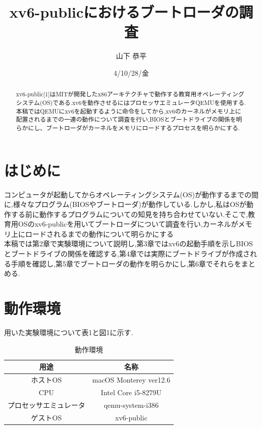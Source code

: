 \documentclass[submit,techreq,noauthor]{eco}	%
\begin{document}
\date   {4/10/28/金}				%
\title  {xv6-publicにおけるブートローダの調査}	%
\author {山下 恭平}				%


\begin{abstract}
xv6-public[1]はMITが開発したx86アーキテクチャで動作する教育用オペレーティングシステム(OS)である.xv6を動作させるにはプロセッサエミュレータQEMUを使用する.本稿ではQEMUにxv6を起動するように命令をしてから,xv6のカーネルがメモリ上に配置されるまでの一連の動作について調査を行い,BIOSとブートドライブの関係を明らかにし、ブートローダがカーネルをメモリにロードするプロセスを明らかにする.

\end{abstract}
\maketitle


\section{はじめに}
コンピュータが起動してからオペレーティングシステム(OS)が動作するまでの間に,様々なプログラム(BIOSやブートローダ)が動作している.しかし,私はOSが動作する前に動作するプログラムについての知見を持ち合わせていない.そこで,教育用OSのxv6-publicを用いてブートローダについて調査を行い,カーネルがメモリ上にロードされるまでの動作について明らかにする\\
\indent 本稿では第2章で実験環境について説明し,第3章ではxv6の起動手順を示しBIOSとブートドライブの関係を確認する,第4章では実際にブートドライブが作成される手順を確認し,第5章でブートローダの動作を明らかにし,第6章でそれらをまとめる.

\section{動作環境}
用いた実験環境について表1と図1に示す.

\begin{table}[H]
\caption{動作環境}
\label{table:data_type}
\begin{tabular}{|c|c|}
\hline
用途          & 名称                     \\ \hline \hline
ホストOS       & macOS Monterey ver12.6 \\ \hline
CPU         & Intel Core i5-8279U    \\ \hline
プロセッサエミュレータ & qemu-system-i386       \\ \hline
ゲストOS       & xv6-public             \\ \hline
\end{tabular}
\end{table}
\end{document}
